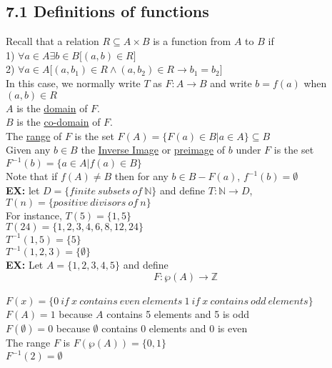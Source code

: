 \documentclass{article}
\begin{document}
 		\subsection{7.1 Definitions of functions}
 		Recall that a relation $R\subseteq A\times B$ is a function from $A$ to $B$ if\\
 		1) $\forall a\in A \exists b\in B \lbrack (a,b)\in R\rbrack$\\
 		2) $\forall a\in A\lbrack(a,b_1)\in R\land(a,b_2)\in R\rightarrow b_1=b_2\rbrack$\\
 		In this case, we normally write $T$ as $F:A\rightarrow B$ and write $b=f(a)$ when $(a,b)\in R$\\
 		$A$ is the \underline{domain} of $F$.\\
 		$B$ is the \underline{co-domain} of $F$.\\
 		The \underline{range} of $F$ is the set $F(A)=\{F(a)\in B|a\in A\}\subseteq B$\\
 		Given any $b\in B$ the \underline{Inverse Image} or \underline{preimage} of $b$ under $F$ is the set $F^{-1}(b)=\{a\in A|f(a)\in B\}$\\
 		Note that if $f(A)\neq B$ then for any $b\in B-F(a)$, $f^{-1}(b)=\emptyset$\\
 		\textbf{EX:} let $D=\{finite\ subsets\ of\ \mathbb{N}\}$ and define $T:\mathbb{N}\rightarrow D$, $T(n)=\{positive\ divisors\ of\ n\}$\\
 		For instance, $T(5)=\{1,5\}$\\
 		$T(24)=\{1,2,3,4,6,8,12,24\}$\\
 		$T^{-1}(1,5)=\{5\}$\\
 		$T^{-1}(1,2,3)=\{\emptyset\}$\\
 		\textbf{EX:} Let $A=\{1,2,3,4,5\}$ and define
 		$$F: \wp(A)\rightarrow \mathbb{Z}$$\\
 		$F(x)=\{0\ if\ x\ contains\ even\ elements\ 1\ if\ x\ contains\ odd\ elements\}$\\
 		$F(A)=1$ because $A$ contains 5 elements and 5 is odd\\
 		$F(\emptyset)=0$ because $\emptyset$ contains 0 elements and 0 is even\\
 		The range $F$ is $F(\wp(A))=\{0,1\}$\\
 		$F^{-1}(2)=\emptyset$
\end{document}
